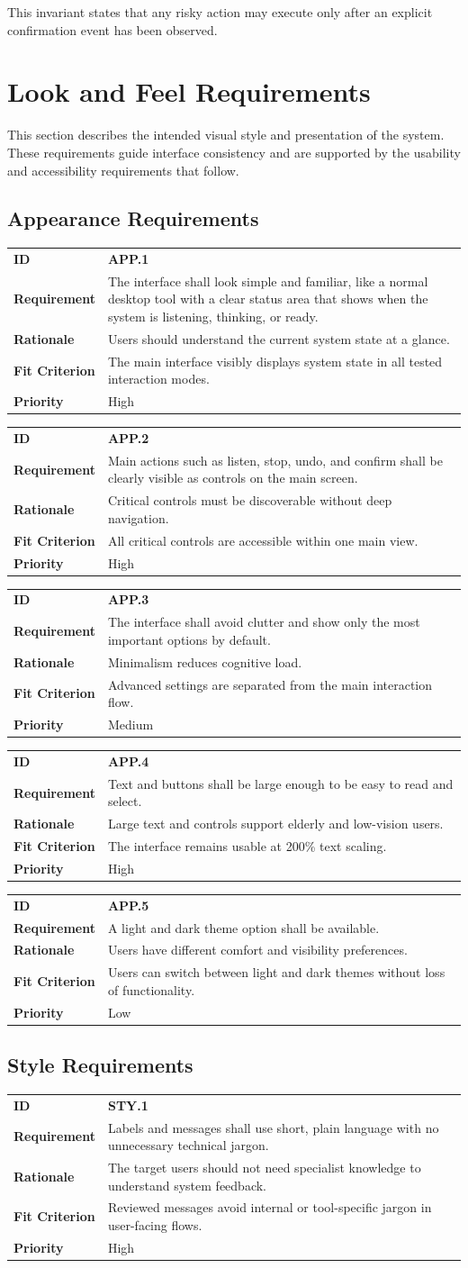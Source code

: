 \documentclass[12pt]{article}
\makeatletter
\newcommand{\reqcard}[5]{%
\noindent\begin{tabularx}{\textwidth}{@{}p{2.35cm}X@{}}
\textbf{ID} & \textbf{#1} \\
\textbf{Requirement} & #2 \\
\textbf{Rationale} & #3 \\
\textbf{Fit Criterion} & #4 \\
\textbf{Priority} & #5 \\
\end{tabularx}\par\medskip
}
\makeatother
\begin{document}
This invariant states that any risky action may execute only after an
explicit confirmation event has been observed.

\section{Look and Feel Requirements}
This section describes the intended visual style and presentation of
the system. These requirements guide interface consistency and are
supported by the usability and accessibility requirements that follow.

\subsection{Appearance Requirements}
\reqcard{APP.1}{The interface shall look simple and familiar, like a
normal desktop tool with a clear status area that shows when the
system is listening, thinking, or ready.}{Users should understand the
current system state at a glance.}{The main interface visibly displays
system state in all tested interaction modes.}{High}

\reqcard{APP.2}{Main actions such as listen, stop, undo, and confirm
shall be clearly visible as controls on the main screen.}{Critical
controls must be discoverable without deep navigation.}{All critical
controls are accessible within one main view.}{High}

\reqcard{APP.3}{The interface shall avoid clutter and show only the
most important options by default.}{Minimalism reduces cognitive
load.}{Advanced settings are separated from the main interaction
flow.}{Medium}

\reqcard{APP.4}{Text and buttons shall be large enough to be easy to
read and select.}{Large text and controls support elderly and
low-vision users.}{The interface remains usable at 200\% text
scaling.}{High}

\reqcard{APP.5}{A light and dark theme option shall be
available.}{Users have different comfort and visibility
preferences.}{Users can switch between light and dark themes without
loss of functionality.}{Low}

\subsection{Style Requirements}
\reqcard{STY.1}{Labels and messages shall use short, plain language
with no unnecessary technical jargon.}{The target users should not
need specialist knowledge to understand system feedback.}{Reviewed
messages avoid internal or tool-specific jargon in user-facing
flows.}{High}
\end{document}
